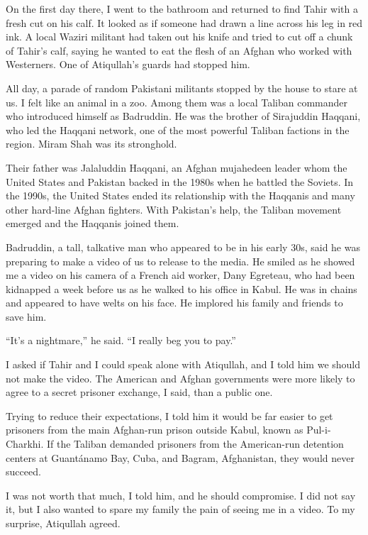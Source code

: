 ﻿\documentclass[12pt]{article}
\begin{document}
On the first day there, I went to the bathroom and returned to find Tahir with a fresh cut on his
calf. It looked as if someone had drawn a line across his leg in red ink. A local Waziri militant
had taken out his knife and tried to cut off a chunk of Tahir's calf, saying he wanted to eat the
flesh of an Afghan who worked with Westerners. One of Atiqullah's guards had stopped him.

All day, a parade of random Pakistani militants stopped by the house to stare at us. I felt like an
animal in a zoo. Among them was a local Taliban commander who introduced himself as Badruddin. He
was the brother of Sirajuddin Haqqani, who led the Haqqani network, one of the most powerful Taliban
factions in the region. Miram Shah was its stronghold.

Their father was Jalaluddin Haqqani, an Afghan mujahedeen leader whom the United States and Pakistan
backed in the 1980s when he battled the Soviets. In the 1990s, the United States ended its
relationship with the Haqqanis and many other hard-line Afghan fighters. With Pakistan's help, the
Taliban movement emerged and the Haqqanis joined them.

Badruddin, a tall, talkative man who appeared to be in his early 30s, said he was preparing to make
a video of us to release to the media. He smiled as he showed me a video on his camera of a French
aid worker, Dany Egreteau, who had been kidnapped a week before us as he walked to his office in
Kabul. He was in chains and appeared to have welts on his face. He implored his family and friends
to save him.

``It's a nightmare,'' he said. ``I really beg you to pay.''

I asked if Tahir and I could speak alone with Atiqullah, and I told him we should not make the
video. The American and Afghan governments were more likely to agree to a secret prisoner exchange,
I said, than a public one.

Trying to reduce their expectations, I told him it would be far easier to get prisoners from the
main Afghan-run prison outside Kabul, known as Pul-i-Charkhi. If the Taliban demanded prisoners from
the American-run detention centers at Guant\'anamo Bay, Cuba, and Bagram, Afghanistan, they would
never succeed.

I was not worth that much, I told him, and he should compromise. I did not say it, but I also wanted
to spare my family the pain of seeing me in a video. To my surprise, Atiqullah agreed.
\end{document}
